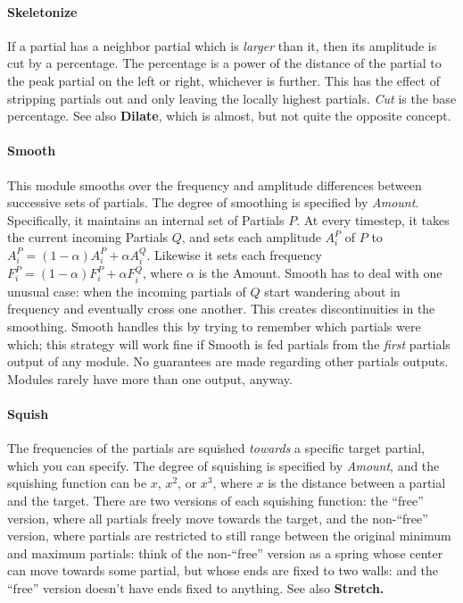 \documentclass{article}
\begin{document}
\paragraph{Skeletonize} If a partial has a neighbor partial which is {\it larger} than it, then its amplitude is cut by a percentage.  The percentage is a power of the distance of the partial to the peak partial on the left or right, whichever is further.  This has the effect of stripping partials out and only leaving the locally highest partials.  {\it Cut} is the base percentage.  See also {\bf Dilate}, which is almost, but not quite the opposite concept.

\paragraph{Smooth} This module smooths over the frequency and amplitude differences between successive sets of partials.  The degree of smoothing is specified by {\it Amount}.  Specifically, it maintains an internal set of Partials \(P\).  At every timestep, it takes the current incoming Partials \(Q\), and sets each amplitude \(A^P_i\) of \(P\) to \(A^P_i = (1-\alpha) A^P_i + \alpha A^Q_i\).  Likewise it sets each frequency \(F^P_i = (1-\alpha) F^P_i + \alpha F^Q_i\), where \(\alpha\) is the Amount.  Smooth has to deal with one unusual case: when the incoming partials of \(Q\) start wandering about in frequency and eventually cross one another.  This creates discontinuities in the smoothing.  Smooth handles this by trying to remember which partials were which; this strategy will work fine if Smooth is fed partials from the {\it first} partials output of any module.  No guarantees are made regarding other partials outputs.  Modules rarely have more than one output, anyway.

\paragraph{Squish} The frequencies of the partials are squished {\it towards} a specific target partial, which you can specify.  The degree of squishing is specified by {\it Amount}, and the squishing function can be \(x\), \(x^2\), or \(x^3\), where \(x\) is the distance between a partial and the target.  There are two versions of each squishing function: the ``free'' version, where all partials freely move towards the target, and the non-``free'' version, where partials are restricted to still range between the original minimum and maximum partials: think of the non-``free'' version as a spring whose center can move towards some partial, but whose ends are fixed to two walls: and the ``free'' version doesn't have ends fixed to anything.  See also  {\bf Stretch.}
\end{document}

